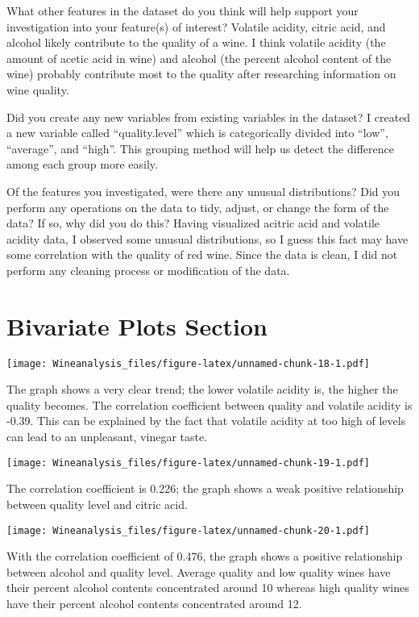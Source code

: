 \documentclass[]{article}
\begin{document}
What other features in the dataset do you think will help support your
investigation into your feature(s) of interest? Volatile acidity, citric
acid, and alcohol likely contribute to the quality of a wine. I think
volatile acidity (the amount of acetic acid in wine) and alcohol (the
percent alcohol content of the wine) probably contribute most to the
quality after researching information on wine quality.

Did you create any new variables from existing variables in the dataset?
I created a new variable called ``quality.level'' which is categorically
divided into ``low'', ``average'', and ``high''. This grouping method
will help us detect the difference among each group more easily.

Of the features you investigated, were there any unusual distributions?
Did you perform any operations on the data to tidy, adjust, or change
the form of the data? If so, why did you do this? Having visualized
acitric acid and volatile acidity data, I observed some unusual
distributions, so I guess this fact may have some correlation with the
quality of red wine. Since the data is clean, I did not perform any
cleaning process or modification of the data.

\section{Bivariate Plots Section}\label{bivariate-plots-section}

\texttt{[image: Wineanalysis\_files/figure-latex/unnamed-chunk-18-1.pdf]}

The graph shows a very clear trend; the lower volatile acidity is, the
higher the quality becomes. The correlation coefficient between quality
and volatile acidity is -0.39. This can be explained by the fact that
volatile acidity at too high of levels can lead to an unpleasant,
vinegar taste.

\texttt{[image: Wineanalysis\_files/figure-latex/unnamed-chunk-19-1.pdf]}

The correlation coefficient is 0.226; the graph shows a weak positive
relationship between quality level and citric acid.

\texttt{[image: Wineanalysis\_files/figure-latex/unnamed-chunk-20-1.pdf]}

With the correlation coefficient of 0.476, the graph shows a positive
relationship between alcohol and quality level. Average quality and low
quality wines have their percent alcohol contents concentrated around 10
whereas high quality wines have their percent alcohol contents
concentrated around 12.
\end{document}
